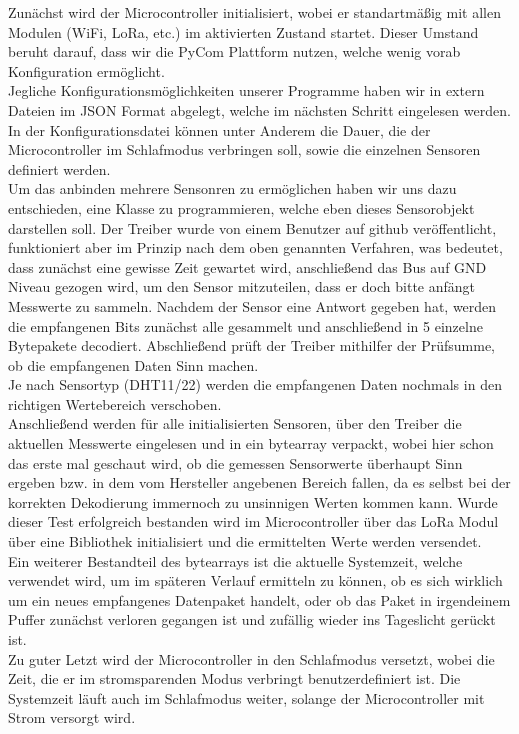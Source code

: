 Zunächst wird der Microcontroller initialisiert, wobei er standartmäßig mit allen Modulen (WiFi, LoRa, etc.) im aktivierten Zustand startet. Dieser Umstand beruht darauf, dass wir die PyCom Plattform nutzen, welche wenig vorab Konfiguration ermöglicht.\\
Jegliche Konfigurationsmöglichkeiten unserer Programme haben wir in extern Dateien im JSON Format abgelegt, welche im nächsten Schritt eingelesen werden. In der Konfigurationsdatei können unter Anderem die Dauer, die der Microcontroller im Schlafmodus verbringen soll, sowie die einzelnen Sensoren definiert werden.\\
Um das anbinden mehrere Sensonren zu ermöglichen haben wir uns dazu entschieden, eine Klasse zu programmieren, welche eben dieses Sensorobjekt darstellen soll. Der Treiber wurde von einem Benutzer auf github veröffentlicht, funktioniert aber im Prinzip nach dem oben genannten Verfahren, was bedeutet, dass zunächst eine gewisse Zeit gewartet wird, anschließend das Bus auf GND Niveau gezogen wird, um den Sensor mitzuteilen, dass er doch bitte anfängt Messwerte zu sammeln. Nachdem der Sensor eine Antwort gegeben hat, werden die empfangenen Bits zunächst alle gesammelt und anschließend in 5 einzelne Bytepakete decodiert. Abschließend prüft der Treiber mithilfer der Prüfsumme, ob die empfangenen Daten Sinn machen.\\ Je nach Sensortyp (DHT11/22) werden die empfangenen Daten nochmals in den richtigen Wertebereich \grqq verschoben\grqq.\\
Anschließend werden für alle initialisierten Sensoren, über den Treiber die aktuellen Messwerte eingelesen und in ein bytearray verpackt, wobei hier schon das erste mal geschaut wird, ob die gemessen Sensorwerte überhaupt Sinn ergeben bzw. in dem vom Hersteller angebenen Bereich fallen, da es selbst bei der korrekten Dekodierung immernoch zu unsinnigen Werten kommen kann. 
Wurde dieser Test erfolgreich bestanden wird im Microcontroller über das LoRa Modul über eine Bibliothek initialisiert und die ermittelten Werte werden versendet.\\ Ein weiterer Bestandteil des bytearrays ist die aktuelle Systemzeit, welche verwendet wird, um im späteren Verlauf ermitteln zu können, ob es sich wirklich um ein neues empfangenes Datenpaket handelt, oder ob das Paket in irgendeinem Puffer zunächst verloren gegangen ist und zufällig wieder ins Tageslicht gerückt ist.\\
Zu guter Letzt wird der Microcontroller in den Schlafmodus versetzt, wobei die Zeit, die er im stromsparenden Modus verbringt benutzerdefiniert ist. Die Systemzeit läuft auch im Schlafmodus weiter, solange der Microcontroller mit Strom versorgt wird.\\


